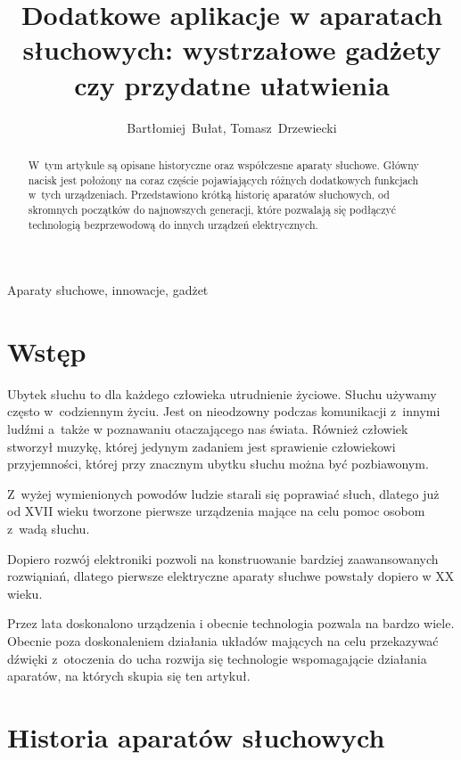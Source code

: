 \documentclass[journal]{IEEEtran}
\title{Dodatkowe aplikacje w aparatach słuchowych: wystrzałowe gadżety czy przydatne ułatwienia}
\author{Bartłomiej~Bułat, Tomasz~Drzewiecki}
\begin{document}

\maketitle


\begin{abstract}
W~tym artykule są opisane historyczne oraz współczesne aparaty słuchowe. Główny nacisk jest położony na coraz częście pojawiających różnych dodatkowych funkcjach w~tych urządzeniach.
Przedstawiono krótką historię aparatów słuchowych, od skromnych początków do najnowszych generacji, które pozwalają się podłączyć technologią bezprzewodową do innych urządzeń elektrycznych.
\end{abstract}

\begin{IEEEkeywords}
Aparaty słuchowe, innowacje, gadżet
\end{IEEEkeywords}

\section{Wstęp}

Ubytek słuchu to dla każdego człowieka utrudnienie życiowe. Słuchu używamy często w~codziennym życiu. Jest on nieodzowny podczas komunikacji z~innymi ludźmi a~także w poznawaniu otaczającego nas świata. Również człowiek stworzył muzykę, której jedynym zadaniem jest sprawienie człowiekowi przyjemności, której przy znacznym ubytku słuchu można być pozbiawonym.

Z~wyżej wymienionych powodów ludzie starali się poprawiać słuch, dlatego już od XVII wieku tworzone pierwsze urządzenia mające na celu pomoc osobom z~wadą słuchu.

Dopiero rozwój elektroniki pozwoli na konstruowanie bardziej zaawansowanych rozwiąniań, dlatego pierwsze elektryczne aparaty słuchwe powstały dopiero w XX wieku.

Przez lata doskonalono urządzenia i obecnie technologia pozwala na bardzo wiele. Obecnie poza doskonaleniem działania układów mających na celu przekazywać dźwięki z~otoczenia do ucha rozwija się technologie wspomagającie działania aparatów, na których skupia się ten artykuł.

\section{Historia aparatów słuchowych}
\end{document}
